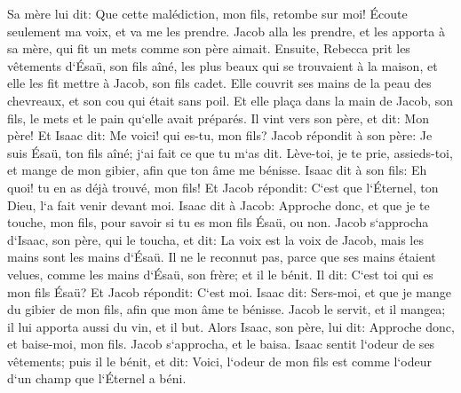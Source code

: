 \verse Sa mère lui dit: Que cette malédiction, mon fils, retombe sur moi! Écoute seulement ma voix, et va me les prendre. 
\verse Jacob alla les prendre, et les apporta à sa mère, qui fit un mets comme son père aimait. 
\verse Ensuite, Rebecca prit les vêtements d`Ésaü, son fils aîné, les plus beaux qui se trouvaient à la maison, et elle les fit mettre à Jacob, son fils cadet. 
\verse Elle couvrit ses mains de la peau des chevreaux, et son cou qui était sans poil. 
\verse Et elle plaça dans la main de Jacob, son fils, le mets et le pain qu`elle avait préparés. 
\verse Il vint vers son père, et dit: Mon père! Et Isaac dit: Me voici! qui es-tu, mon fils? 
\verse Jacob répondit à son père: Je suis Ésaü, ton fils aîné; j`ai fait ce que tu m`as dit. Lève-toi, je te prie, assieds-toi, et mange de mon gibier, afin que ton âme me bénisse. 
\verse Isaac dit à son fils: Eh quoi! tu en as déjà trouvé, mon fils! Et Jacob répondit: C`est que l`Éternel, ton Dieu, l`a fait venir devant moi. 
\verse Isaac dit à Jacob: Approche donc, et que je te touche, mon fils, pour savoir si tu es mon fils Ésaü, ou non. 
\verse Jacob s`approcha d`Isaac, son père, qui le toucha, et dit: La voix est la voix de Jacob, mais les mains sont les mains d`Ésaü. 
\verse Il ne le reconnut pas, parce que ses mains étaient velues, comme les mains d`Ésaü, son frère; et il le bénit. 
\verse Il dit: C`est toi qui es mon fils Ésaü? Et Jacob répondit: C`est moi. 
\verse Isaac dit: Sers-moi, et que je mange du gibier de mon fils, afin que mon âme te bénisse. Jacob le servit, et il mangea; il lui apporta aussi du vin, et il but. 
\verse Alors Isaac, son père, lui dit: Approche donc, et baise-moi, mon fils. 
\verse Jacob s`approcha, et le baisa. Isaac sentit l`odeur de ses vêtements; puis il le bénit, et dit: Voici, l`odeur de mon fils est comme l`odeur d`un champ que l`Éternel a béni. 
